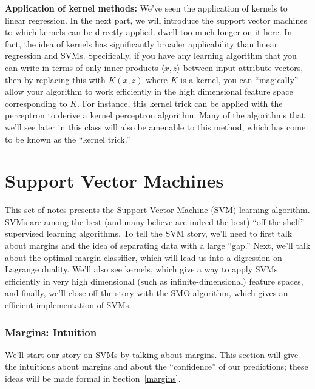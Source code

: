 \documentclass{article}
\begin{document}
\noindent
{\bf Application of kernel methods:} We've seen the application of kernels to linear regression. In the next part, we will introduce the support vector machines to which kernels can be directly applied. 
dwell too much longer on it here.  In fact,  the idea of kernels has
significantly broader applicability than linear regression and SVMs.  
Specifically, if you have any learning
algorithm that you can write in terms of only inner products
$\langle x, z \rangle$ between input attribute vectors, then by replacing this with $K(x,z)$ where
$K$ is a kernel, you can ``magically'' allow your algorithm to work efficiently in the high dimensional
feature space corresponding to $K$.  For instance, this kernel trick can be applied with the perceptron
to derive a kernel perceptron algorithm. Many of the algorithms that we'll see later in this
class will also be amenable to this method, which has come to be known as the ``kernel trick.''


\part{Support Vector Machines}

This set of notes presents the Support Vector Machine (SVM) learning algorithm.
SVMs are among the best (and many believe are indeed the best) ``off-the-shelf''
supervised learning algorithms.  To tell the SVM story, we'll need to first talk about margins and the idea of
separating data with a large ``gap.''  Next, we'll talk about the optimal margin
classifier, which will lead us into a digression on Lagrange duality.  We'll also see
kernels, which give a way to apply SVMs efficiently in very high
dimensional (such as infinite-dimensional) feature spaces, and finally, we'll
close off the story with the SMO algorithm, which gives an efficient implementation
of SVMs.

\section{Margins: Intuition}

We'll start our story on SVMs by talking about margins.  This section will give the
intuitions about margins and about the ``confidence'' of our predictions; these ideas
will be made formal in Section~\ref{margins}.
\end{document}
